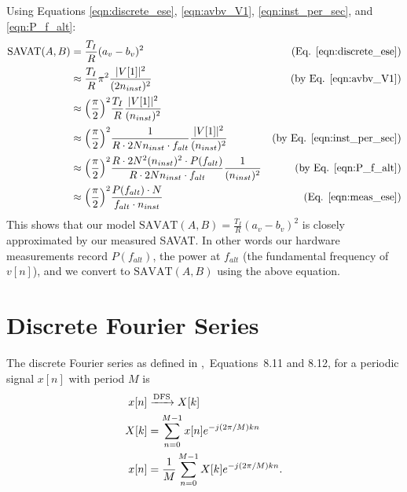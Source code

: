 \vskip 0.1in
Using Equations \ref{eqn:discrete_ese}, \ref{eqn:avbv_V1}, \ref{eqn:inst_per_sec}, and \ref{eqn:P_f_alt}:
\begin{equation}
  \label{eqn:ese_pwr}
  \begin{aligned}
    \textrm{SAVAT}(A,B) & = \frac{T_I}{R} (a_v-b_v)^2
    \hfill & \text{(Eq. \ref{eqn:discrete_ese})}\\
    & \approx \frac{T_I}{R} \pi^2 \frac{|V[1]|^2}{(2n_{inst})^2}
    \hfill & \text{(by Eq. \ref{eqn:avbv_V1})}\\
    & \approx \Big(\frac{\pi}{2}\Big)^2 \frac{T_I}{R}  \frac{|V[1]|^2}{(n_{inst})^2} \\
    & \approx \Big(\frac{\pi}{2}\Big)^2 \frac{1}{R\cdot 2Nn_{inst} \cdot f_{alt}} \frac{|V[1]|^2}{(n_{inst})^2}
    \hfill & \text{(by Eq. \ref{eqn:inst_per_sec})}\\
    & \approx \Big(\frac{\pi}{2}\Big)^2 \frac{R\cdot 2N^2(n_{inst})^2 \cdot P(f_{alt})}{R\cdot 2Nn_{inst} \cdot f_{alt}} \frac{1}{(n_{inst})^2}
    \hfill & \text{(by Eq. \ref{eqn:P_f_alt})} \\
    & \approx \Big(\frac{\pi}{2}\Big)^2 \frac{P(f_{alt}) \cdot N}{f_{alt} \cdot n_{inst}}
    \hfill & \text{(Eq. \ref{eqn:meas_ese})} \\
  \end{aligned}
\end{equation}
This shows that our model \hbox{$\textrm{SAVAT}(A,B) = \frac{T_I}{R} (a_v-b_v)^2$} is closely approximated by our measured SAVAT. In other words our hardware measurements record $P(f_{alt})$,
the power at $f_{alt}$ (the fundamental frequency of $v[n]$), and we convert to $\textrm{SAVAT}(A,B)$ using the above equation.

\chapter{Discrete Fourier Series}
\label{DFS}
The discrete Fourier series as defined in \cite{DTSP},~Equations~8.11 and 8.12, for a periodic signal $x[n]$ with period $M$ is
\begin{equation}
  \begin{aligned}
    x[n]  & \xrightarrow{\rm DFS} X[k] \\
    X[k]  & = \sum_{n=0}^{M-1} x[n] e^{-j(2\pi/M)kn} \\
    x[n]  & = \frac{1}{M} \sum_{n=0}^{M-1} X[k] e^{-j(2\pi/M)kn}.
  \end{aligned}
\end{equation}

